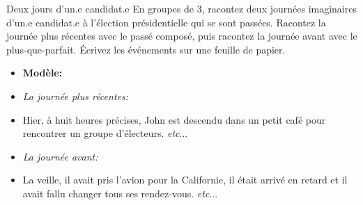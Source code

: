 \begin{frame}{Deux jours d'un.e candidat.e}
  En groupes de 3, racontez deux journées imaginaires d'un.e candidat.e à l'élection présidentielle qui se sont passées.
  Racontez la journée plus récentes \alert{avec le passé composé}, puis racontez la journée avant \alert{avec le plus-que-parfait}.
  Écrivez les événements sur une feuille de papier.
  \begin{itemize}
    \item[] \textbf{Modèle:}
    \item[] \emph{La journée plus récentes:}
    \item Hier, à huit heures précises, John est descendu dans un petit café pour rencontrer un groupe d'électeurs. \emph{etc}...
    \item[] \emph{La journée avant:}
    \item La veille, il avait pris l'avion pour la Californie, il était arrivé en retard et il avait fallu changer tous ses rendez-vous. \emph{etc}...
  \end{itemize}
\end{frame}